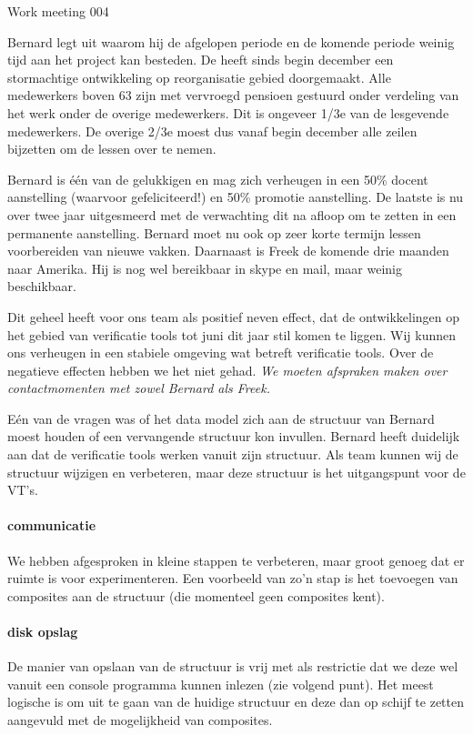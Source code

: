 \documentclass[a4paper,final]{article}
\begin{document}
\begin{Minutes}{Work meeting 004}

Bernard legt uit waarom hij de afgelopen periode en de komende periode weinig tijd 
aan het project kan besteden. De \ou heeft sinds begin december een stormachtige 
ontwikkeling op reorganisatie gebied doorgemaakt. Alle medewerkers
boven 63 zijn met vervroegd pensioen gestuurd onder verdeling van het werk onder de
overige medewerkers. Dit is ongeveer 1/3e van de lesgevende medewerkers. De overige
2/3e moest dus vanaf begin december alle zeilen bijzetten om de lessen over te nemen.

Bernard is \'e\'en van de gelukkigen en mag zich verheugen in een 50\% docent 
aanstelling (waarvoor gefeliciteerd!) en 50\% promotie aanstelling. 
De laatste is nu over twee jaar uitgesmeerd met de verwachting dit 
na afloop om te zetten in een permanente aanstelling. Bernard moet nu ook op zeer 
korte termijn lessen voorbereiden van nieuwe vakken. Daarnaast is Freek de komende 
drie maanden naar Amerika. Hij is nog wel bereikbaar in skype en mail, maar weinig 
beschikbaar. 

Dit geheel heeft voor ons team als positief neven effect, dat de ontwikkelingen 
op het gebied van verificatie tools tot juni dit jaar stil komen te liggen. Wij 
kunnen ons verheugen in een stabiele omgeving wat betreft verificatie tools. 
Over de negatieve effecten hebben we het niet gehad. \textit{We moeten afspraken maken 
over contactmomenten met zowel Bernard als Freek.}


E\'en van de vragen was of het data model zich aan de structuur van Bernard moest 
houden of een vervangende structuur kon invullen. Bernard heeft duidelijk aan dat
de verificatie tools werken vanuit zijn structuur. Als team kunnen wij de structuur
wijzigen en verbeteren, maar deze structuur is het uitgangspunt voor de VT's.

\paragraph{communicatie} We hebben afgesproken in kleine stappen te verbeteren, maar 
groot genoeg dat er ruimte is voor experimenteren. Een voorbeeld van zo'n stap is het 
toevoegen van composites aan de structuur (die momenteel geen composites kent). 

\paragraph{disk opslag} De manier van opslaan van de structuur is vrij met als 
restrictie dat we deze wel vanuit een console programma kunnen inlezen (zie volgend punt). 
Het meest logische is om uit te gaan van de huidige structuur en deze dan op schijf te 
zetten aangevuld met de mogelijkheid van composites. 


\end{Minutes}
\end{document}
